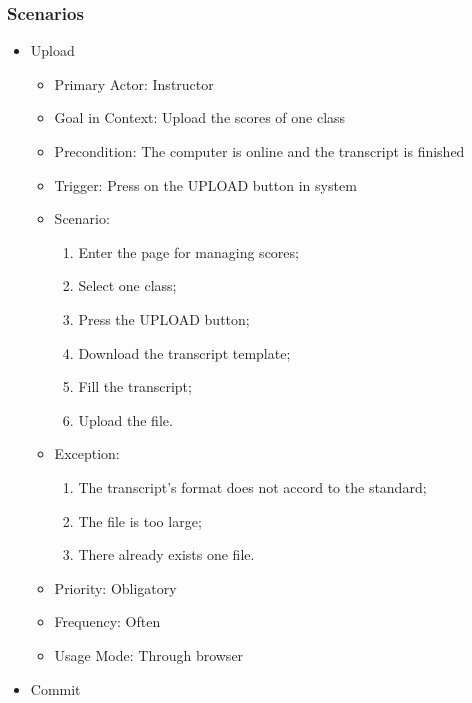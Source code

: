 \documentclass[a4]{article}
\begin{document}
\subsubsection{Scenarios}
\begin{itemize}


\item Upload

\begin{itemize}
\item Primary Actor: Instructor
\item Goal in Context: Upload the scores of one class
\item Precondition: The computer is online and  the transcript is finished
\item Trigger: Press on the UPLOAD button in system
\item Scenario: 
\begin{enumerate}
\item Enter the page for managing scores;
\item Select one class;
\item Press the UPLOAD button;
\item Download the transcript template;
\item Fill the transcript;
\item Upload the file.
\end{enumerate}
\item Exception:
\begin{enumerate}
\item The transcript's format does not accord to the standard;
\item The file is too large;
\item There already exists one file.
\end{enumerate}
\item Priority: Obligatory
\item Frequency: Often
\item Usage Mode: Through browser
\end{itemize}


\item Commit


\end{itemize}
\end{document}
